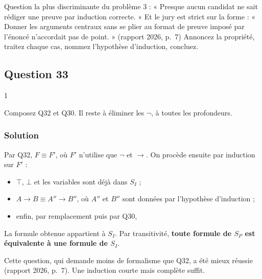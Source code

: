 \documentclass[11pt,a4paper]{article}
\providecommand{\tightlist}{\setlength{\itemsep}{0pt}\setlength{\parskip}{0pt}}
\newcommand{\equationajustee}[1]{%
  \sbox{\boiteequation}{$\displaystyle #1$}%
  \ifdim\wd\boiteequation>\linewidth
    \[\resizebox{\linewidth}{!}{\usebox{\boiteequation}}\]%
  \else
    \[#1\]%
  \fi}
\begin{document}
\begin{jury}

Question la plus discriminante du problème 3 : « Presque aucun candidat ne sait rédiger une preuve par induction correcte. » Et le jury est strict sur la forme : « Donner les arguments centraux sans se plier au format de preuve imposé par l'énoncé n'accordait pas de point. » (rapport 2026, p.~7) Annoncez la propriété, traitez chaque cas, nommez l'hypothèse d'induction, concluez.

\end{jury}

\hypertarget{question-33}{%
\subsection{Question 33}\label{question-33}}

\begin{indication}{1}

Composez Q32 et Q30. Il reste à éliminer les \(\neg\), à toutes les profondeurs.

\end{indication}

\hypertarget{solution-32}{%
\subsubsection{Solution}\label{solution-32}}

Par Q32, \(F \equiv F'\), où \(F'\) n'utilise que \(\neg\) et \(\to\). On procède ensuite par induction sur \(F'\) :

\begin{itemize}
\tightlist
\item
  \(\top\), \(\bot\) et les variables sont déjà dans \(S_I\) ;
\item
  \(A \to B \equiv A'' \to B''\), où \(A''\) et \(B''\) sont données par l'hypothèse d'induction ;
\item
  enfin, par remplacement puis par Q30,
\end{itemize}

\equationajustee{\begin{aligned}
\neg A &\equiv \neg A'' \\
&\equiv A'' \to \bot.
\end{aligned}}

La formule obtenue appartient à \(S_I\). Par transitivité, \textbf{toute formule de \(S_P\) est équivalente à une formule de \(S_I\)}.

\begin{jury}

Cette question, qui demande moins de formalisme que Q32, a été mieux réussie (rapport 2026, p.~7). Une induction courte mais complète suffit.

\end{jury}
\end{document}
